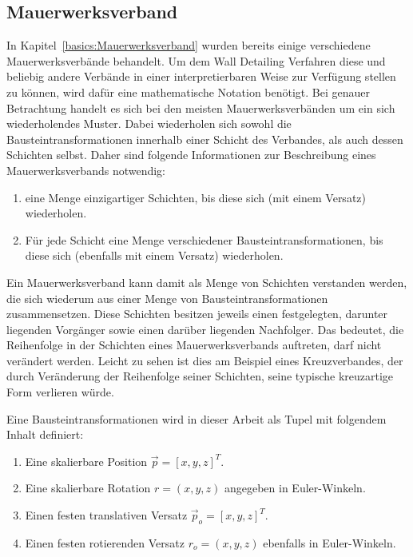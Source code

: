 \subsection{Mauerwerksverband}\label{concept:mauerwerksverband}
In Kapitel~\ref{basics:Mauerwerksverband} wurden bereits einige verschiedene Mauerwerksverbände behandelt.
Um dem Wall Detailing Verfahren diese und beliebig andere Verbände in einer interpretierbaren Weise zur Verfügung stellen zu können, wird dafür eine mathematische Notation benötigt.
Bei genauer Betrachtung handelt es sich bei den meisten Mauerwerksverbänden um ein sich wiederholendes Muster.
Dabei wiederholen sich sowohl die Bausteintransformationen innerhalb einer Schicht des Verbandes, als auch dessen Schichten selbst.
Daher sind folgende Informationen zur Beschreibung eines Mauerwerksverbands notwendig:

\begin{enumerate}
    \item eine Menge einzigartiger Schichten, bis diese sich (mit einem Versatz) wiederholen.
    \item Für jede Schicht eine Menge verschiedener Bausteintransformationen, bis diese sich (ebenfalls mit einem Versatz) wiederholen.
\end{enumerate}

Ein Mauerwerksverband kann damit als Menge von Schichten verstanden werden, die sich wiederum aus einer Menge von Bausteintransformationen zusammensetzen.
Diese Schichten besitzen jeweils einen festgelegten, darunter liegenden Vorgänger sowie einen darüber liegenden Nachfolger.
Das bedeutet, die Reihenfolge in der Schichten eines Mauerwerksverbands auftreten, darf nicht verändert werden.
Leicht zu sehen ist dies am Beispiel eines Kreuzverbandes, der durch Veränderung der Reihenfolge seiner Schichten, seine typische kreuzartige Form verlieren würde.

Eine Bausteintransformationen wird in dieser Arbeit als Tupel mit folgendem Inhalt definiert:

\begin{enumerate}
    \item Eine skalierbare Position \(\vec{p} = {[x, y, z]}^T\).
    \item Eine skalierbare Rotation \(r = (x, y, z)\) angegeben in Euler-Winkeln.
    \item Einen festen translativen Versatz \(\vec{p}_o = {[x, y, z]}^T\).
    \item Einen festen rotierenden Versatz \(r_o = (x, y, z)\) ebenfalls in Euler-Winkeln.
\end{enumerate}

